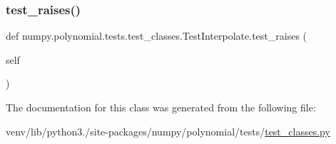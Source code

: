 \subsubsection{\texorpdfstring{test\+\_\+raises()}{test\_raises()}}
{\footnotesize\ttfamily def numpy.\+polynomial.\+tests.\+test\+\_\+classes.\+Test\+Interpolate.\+test\+\_\+raises (\begin{DoxyParamCaption}\item[{}]{self }\end{DoxyParamCaption})}



The documentation for this class was generated from the following file\+:\begin{DoxyCompactItemize}
\item 
venv/lib/python3./site-\/packages/numpy/polynomial/tests/\hyperlink{test__classes_8py}{test\+\_\+classes.\+py}\end{DoxyCompactItemize}
